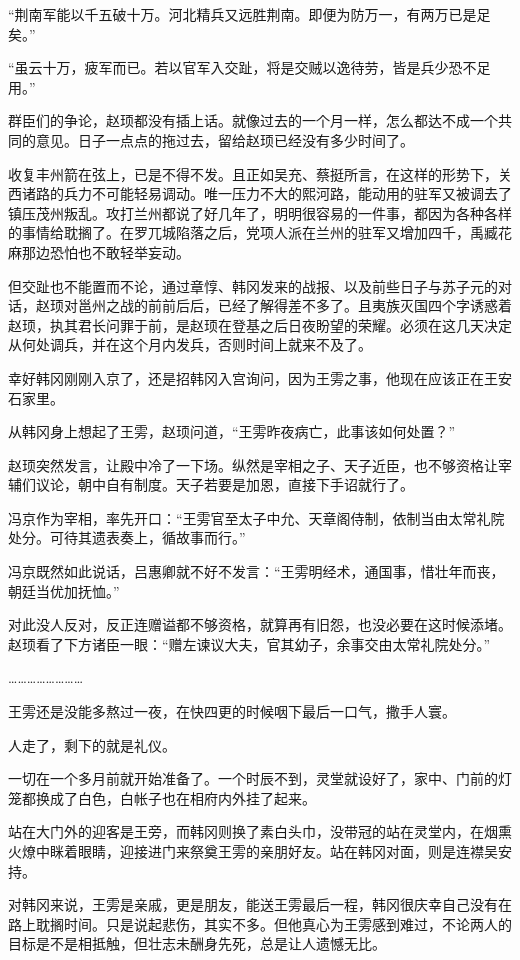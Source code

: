 “荆南军能以千五破十万。河北精兵又远胜荆南。即便为防万一，有两万已是足矣。”

“虽云十万，疲军而已。若以官军入交趾，将是交贼以逸待劳，皆是兵少恐不足用。”

群臣们的争论，赵顼都没有插上话。就像过去的一个月一样，怎么都达不成一个共同的意见。日子一点点的拖过去，留给赵顼已经没有多少时间了。

收复丰州箭在弦上，已是不得不发。且正如吴充、蔡挺所言，在这样的形势下，关西诸路的兵力不可能轻易调动。唯一压力不大的熙河路，能动用的驻军又被调去了镇压茂州叛乱。攻打兰州都说了好几年了，明明很容易的一件事，都因为各种各样的事情给耽搁了。在罗兀城陷落之后，党项人派在兰州的驻军又增加四千，禹臧花麻那边恐怕也不敢轻举妄动。

但交趾也不能置而不论，通过章惇、韩冈发来的战报、以及前些日子与苏子元的对话，赵顼对邕州之战的前前后后，已经了解得差不多了。且夷族灭国四个字诱惑着赵顼，执其君长问罪于前，是赵顼在登基之后日夜盼望的荣耀。必须在这几天决定从何处调兵，并在这个月内发兵，否则时间上就来不及了。

幸好韩冈刚刚入京了，还是招韩冈入宫询问，因为王雱之事，他现在应该正在王安石家里。

从韩冈身上想起了王雱，赵顼问道，“王雱昨夜病亡，此事该如何处置？”

赵顼突然发言，让殿中冷了一下场。纵然是宰相之子、天子近臣，也不够资格让宰辅们议论，朝中自有制度。天子若要是加恩，直接下手诏就行了。

冯京作为宰相，率先开口：“王雱官至太子中允、天章阁侍制，依制当由太常礼院处分。可待其遗表奏上，循故事而行。”

冯京既然如此说话，吕惠卿就不好不发言：“王雱明经术，通国事，惜壮年而丧，朝廷当优加抚恤。”

对此没人反对，反正连赠谥都不够资格，就算再有旧怨，也没必要在这时候添堵。赵顼看了下方诸臣一眼：“赠左谏议大夫，官其幼子，余事交由太常礼院处分。”

……………………

王雱还是没能多熬过一夜，在快四更的时候咽下最后一口气，撒手人寰。

人走了，剩下的就是礼仪。

一切在一个多月前就开始准备了。一个时辰不到，灵堂就设好了，家中、门前的灯笼都换成了白色，白帐子也在相府内外挂了起来。

站在大门外的迎客是王旁，而韩冈则换了素白头巾，没带冠的站在灵堂内，在烟熏火燎中眯着眼睛，迎接进门来祭奠王雱的亲朋好友。站在韩冈对面，则是连襟吴安持。

对韩冈来说，王雱是亲戚，更是朋友，能送王雱最后一程，韩冈很庆幸自己没有在路上耽搁时间。只是说起悲伤，其实不多。但他真心为王雱感到难过，不论两人的目标是不是相抵触，但壮志未酬身先死，总是让人遗憾无比。

